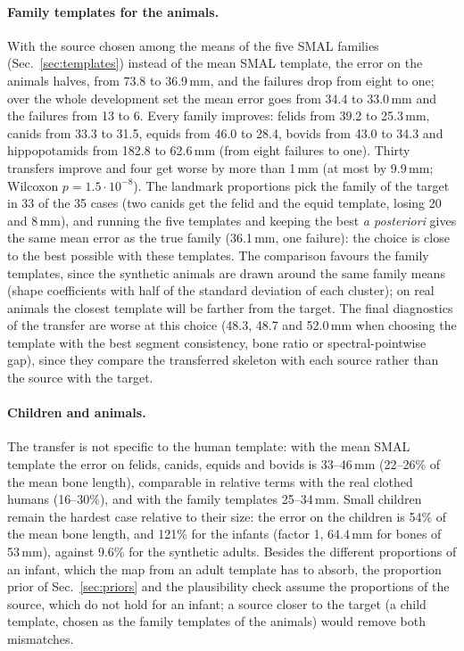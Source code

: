\documentclass[11pt]{article}
\begin{document}
\paragraph{Family templates for the animals.}
With the source chosen among the means of the five SMAL families
(Sec.~\ref{sec:templates}) instead of the mean SMAL template, the error on the
animals halves, from 73.8 to 36.9\,mm, and the failures drop from eight to
one; over the whole development set the mean error goes from 34.4 to
33.0\,mm and the failures from 13 to 6. Every family improves: felids from
39.2 to 25.3\,mm, canids from 33.3 to 31.5, equids from 46.0 to 28.4, bovids
from 43.0 to 34.3 and hippopotamids from 182.8 to 62.6\,mm (from eight
failures to one). Thirty transfers improve and four get worse by more than
1\,mm (at most by 9.9\,mm; Wilcoxon $p = 1.5\cdot 10^{-8}$). The landmark
proportions pick the family of the target in 33 of the 35 cases (two canids
get the felid and the equid template, losing 20 and 8\,mm), and running the
five templates and keeping the best \emph{a posteriori} gives the same mean
error as the true family (36.1\,mm, one failure): the choice is close to the
best possible with these templates. The comparison favours the family
templates, since the synthetic animals are drawn around the same family means
(shape coefficients with half of the standard deviation of each cluster); on
real animals the closest template will be farther from the target. The final
diagnostics of the transfer are worse at this choice (48.3, 48.7 and
52.0\,mm when choosing the template with the best segment consistency, bone
ratio or spectral-pointwise gap), since they compare the transferred skeleton
with each source rather than the source with the target.

\paragraph{Children and animals.} The transfer is not specific to the
human template: with the mean SMAL template the error on felids, canids, equids
and bovids is 33--46\,mm (22--26\% of the mean bone length), comparable in
relative terms with the real clothed humans (16--30\%), and with the family
templates 25--34\,mm. Small children remain the
hardest case relative to their size: the error on the children is 54\% of
the mean bone length, and 121\% for the infants (factor 1, 64.4\,mm for bones
of 53\,mm), against 9.6\% for the synthetic adults. Besides the different
proportions of an infant, which the map from an adult template has to absorb,
the proportion prior of Sec.~\ref{sec:priors} and the plausibility check
assume the proportions of the source, which do not hold for an infant; a
source closer to the target (a child template, chosen as the family templates
of the animals) would remove both mismatches.
\end{document}
